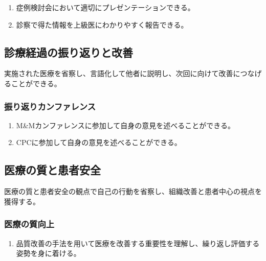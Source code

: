 \begin{enumerate}
\def\labelenumi{\arabic{enumi}.}
\tightlist
\item
  症例検討会において適切にプレゼンテーションできる。
\item
  診察で得た情報を上級医にわかりやすく報告できる。
\end{enumerate}

\hypertarget{ux8a3aux7642ux7d4cux904eux306eux632fux308aux8fd4ux308aux3068ux6539ux5584}{%
\subsection{診療経過の振り返りと改善}\label{ux8a3aux7642ux7d4cux904eux306eux632fux308aux8fd4ux308aux3068ux6539ux5584}}

実施された医療を省察し、言語化して他者に説明し、次回に向けて改善につなげることができる。

\hypertarget{ux632fux308aux8fd4ux308aux30abux30f3ux30d5ux30a1ux30ecux30f3ux30b9}{%
\subsubsection{振り返りカンファレンス}\label{ux632fux308aux8fd4ux308aux30abux30f3ux30d5ux30a1ux30ecux30f3ux30b9}}

\begin{enumerate}
\def\labelenumi{\arabic{enumi}.}
\tightlist
\item
  M\&Mカンファレンスに参加して自身の意見を述べることができる。
\item
  CPCに参加して自身の意見を述べることができる。
\end{enumerate}

\hypertarget{ux533bux7642ux306eux8ceaux3068ux60a3ux8005ux5b89ux5168}{%
\subsection{医療の質と患者安全}\label{ux533bux7642ux306eux8ceaux3068ux60a3ux8005ux5b89ux5168}}

医療の質と患者安全の観点で自己の行動を省察し、組織改善と患者中心の視点を獲得する。

\hypertarget{ux533bux7642ux306eux8ceaux5411ux4e0a}{%
\subsubsection{医療の質向上}\label{ux533bux7642ux306eux8ceaux5411ux4e0a}}

\begin{enumerate}
\def\labelenumi{\arabic{enumi}.}
\tightlist
\item
  品質改善の手法を用いて医療を改善する重要性を理解し、繰り返し評価する姿勢を身に着ける。
\end{enumerate}

